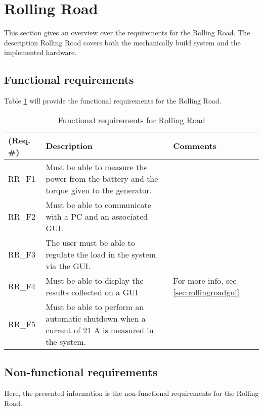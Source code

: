\section{Rolling Road}
This section gives an overview over the requirements for the Rolling Road. The description Rolling Road covers both the mechanically build system and the implemented hardware.

\subsection{Functional requirements}
Table \ref{Functional:Rolling Road} will provide the functional requirements for the Rolling Road.

\begin{table}[h!]
	\centering
	\begin{tabular}{|p{2 cm}|p{7 cm}|p{4 cm}|}
	\hline
	\textbf{(Req. \#)} & \textbf{Description} & \textbf{Comments} \\\hline
	RR\_F1	& Must be able to measure the power from the battery and the torque given to the generator. &   \\\hline
	RR\_F2	& Must be able to communicate with a PC and an associated GUI. &   \\\hline
	RR\_F3	& The user must be able to regulate the load in the system via the GUI. &   \\\hline
	RR\_F4	& Must be able to display the results collected on a GUI & For more info, see \ref{sec:rollingroadgui}  \\\hline
	RR\_F5	& Must be able to perform an automatic shutdown when a current of 21 A is measured in the system. &   \\\hline
	\end{tabular}
	\label{Functional:Rolling Road}
	\caption{Functional requirements for Rolling Road}
\end{table}

\subsection{Non-functional requirements}
Here, the presented information is the non-functional requirements for the Rolling Road.

